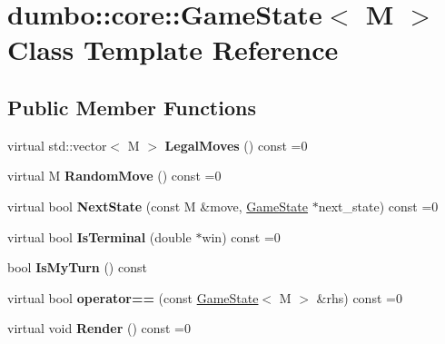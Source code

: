 \hypertarget{classdumbo_1_1core_1_1_game_state}{\section{dumbo\-:\-:core\-:\-:Game\-State$<$ M $>$ Class Template Reference}
\label{classdumbo_1_1core_1_1_game_state}
}
\subsection*{Public Member Functions}
\begin{DoxyCompactItemize}
\item 
\hypertarget{classdumbo_1_1core_1_1_game_state_a8b69e211496715e3969e5870df7428ae}{virtual std\-::vector$<$ M $>$ {\bfseries Legal\-Moves} () const =0}\label{classdumbo_1_1core_1_1_game_state_a8b69e211496715e3969e5870df7428ae}

\item 
\hypertarget{classdumbo_1_1core_1_1_game_state_aa23134e68598c061db73b70bfc968c35}{virtual M {\bfseries Random\-Move} () const =0}\label{classdumbo_1_1core_1_1_game_state_aa23134e68598c061db73b70bfc968c35}

\item 
\hypertarget{classdumbo_1_1core_1_1_game_state_a3e225cf3b0e9b396ae784612171c1035}{virtual bool {\bfseries Next\-State} (const M \&move, \hyperlink{classdumbo_1_1core_1_1_game_state}{Game\-State} $\ast$next\-\_\-state) const =0}\label{classdumbo_1_1core_1_1_game_state_a3e225cf3b0e9b396ae784612171c1035}

\item 
\hypertarget{classdumbo_1_1core_1_1_game_state_ac57f7f288be7ff5d1099fda47bb2e117}{virtual bool {\bfseries Is\-Terminal} (double $\ast$win) const =0}\label{classdumbo_1_1core_1_1_game_state_ac57f7f288be7ff5d1099fda47bb2e117}

\item 
\hypertarget{classdumbo_1_1core_1_1_game_state_ae89148286c9ae76017aec212efe393bd}{bool {\bfseries Is\-My\-Turn} () const }\label{classdumbo_1_1core_1_1_game_state_ae89148286c9ae76017aec212efe393bd}

\item 
\hypertarget{classdumbo_1_1core_1_1_game_state_ae244ca510aa640f97847fbaff6f2fa3d}{virtual bool {\bfseries operator==} (const \hyperlink{classdumbo_1_1core_1_1_game_state}{Game\-State}$<$ M $>$ \&rhs) const =0}\label{classdumbo_1_1core_1_1_game_state_ae244ca510aa640f97847fbaff6f2fa3d}

\item 
\hypertarget{classdumbo_1_1core_1_1_game_state_afad8470a5155a6a0c7ef244f1eb1ffac}{virtual void {\bfseries Render} () const =0}\label{classdumbo_1_1core_1_1_game_state_afad8470a5155a6a0c7ef244f1eb1ffac}

\end{DoxyCompactItemize}
